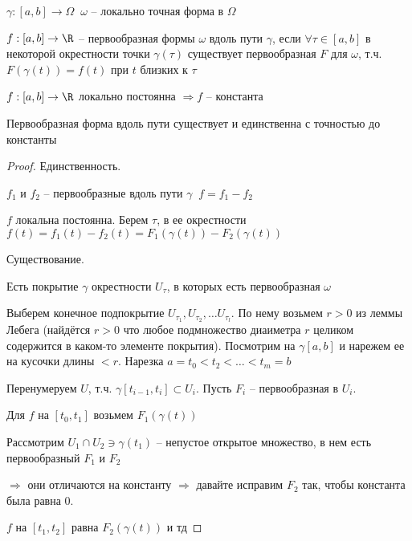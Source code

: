 
\begin{definition}\thmslashn
	
	$\gamma:[a, b] \to \Omega\;\; \omega$ -- локально точная форма в $\Omega$
	
	$f:[a, b] \to \R$ -- первообразная формы $\omega$ вдоль пути $\gamma$, если $\forall \tau \in [a, b]$ в некоторой окрестности точки $\gamma(\tau)$ существует первообразная $F$ для $\omega$, т.ч. $F(\gamma(t)) = f(t)$ при $t$ близких к $\tau$
	
\end{definition}

\begin{lemma}
	$f:[a, b] \to \R$ локально постоянна $\Rightarrow f$ -- константа
\end{lemma}

\begin{theorem}\thmslashn
	
	Первообразная форма вдоль пути существует и единственна с точностью до константы
	
\end{theorem}

\begin{proof}
	
	Единственность.
	
	 $f_1$ и $f_2$ -- первообразные вдоль пути $\gamma\;\; f = f_1 - f_2$ 
	
	$f$ локальна постоянна. Берем $\tau$, в ее окрестности  $f(t) = f_1(t) - f_2(t) = F_1(\gamma(t)) - F_2(\gamma(t))$
	
	Существование. 
	
	Есть покрытие $\gamma$ окрестности $U_\tau$, в которых есть первообразная $\omega$
	
    Выберем конечное подпокрытие $U_{\tau_1}, U_{\tau_2}, \ldots U_{\tau_l}$. По нему возьмем $r>0$ из леммы Лебега (найдётся $r > 0$ что любое подмножество диаиметра $r$ целиком содержится в каком-то элементе покрытия). Посмотрим на $\gamma[a, b]$ и нарежем ее на кусочки длины $<r$. Нарезка $a = t_0 < t_2 < \ldots < t_m = b$
	
	Перенумеруем $U$, т.ч. $\gamma[t_{i-1}, t_i] \subset U_i$. Пусть $F_i$ -- первообразная в $U_i$. 
	
	Для $f$ на $[t_0, t_1]$ возьмем $F_1(\gamma(t))$
	
	Рассмотрим $U_1 \cap U_2 \ni \gamma(t_1)$ -- непустое открытое множество, в нем есть первообразный $F_1$ и $F_2$
	
	$\Rightarrow$ они отличаются на константу $\Rightarrow$ давайте исправим $F_2$ так, чтобы константа была равна 0.
	
	$f$ на $[t_1, t_2]$ равна $F_2(\gamma(t))$ и тд
	
\end{proof}

